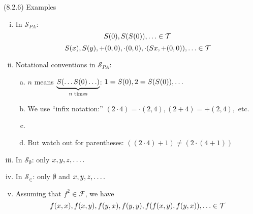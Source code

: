 \begin{frame}{(8.2.6) Examples}

	\begin{enumerate}[(i)]
			
				\item In $\mathcal{S}_{PA}$: \[S(0),S(S(0)),\mathellipsis\in\mathcal{T}\]\[S(x), S(y), +(0,0), \cdot(0,0), \cdot (Sx, +(0,0)),\mathellipsis\in\mathcal{T}\]	
				
				\item[] Notational conventions in $\mathcal{S}_{PA}$: 
				\begin{enumerate}[(a)]
					
					\item ${n}$ means $\underbrace{S(\mathellipsis S(0)\mathellipsis)}_{n\text{ times}}$: $1=S(0),2=S(S(0)),\mathellipsis$
					
					\item We use ``infix notation:''  $(2\cdot 4)={\cdot}(2,4), (2+ 4)={+}(2,4),$ etc.
					
					\item[] 
					
					\item[] But watch out for parentheses: $((2\cdot 4)+1)\neq (2\cdot (4+1))$
				\end{enumerate}
			
				\item In $\mathcal{S}_\emptyset$: only $x,y,z,\mathellipsis.$
				
				\item In $\mathcal{S}_\in$: only $\emptyset$ and $x,y,z,\mathellipsis.$				
				\item Assuming that $f^2\in\mathcal{F}$, we have \[f(x,x), f(x,y), f(y,x), f(y,y), f(f(x,y), f(y,x)),\mathellipsis\in\mathcal{T}\]
			\end{enumerate}


\end{frame}

